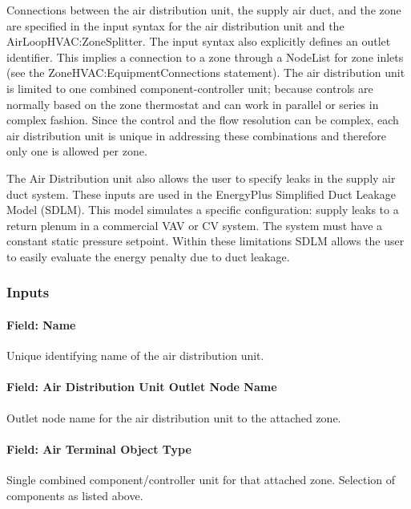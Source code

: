 Connections between the air distribution unit, the supply air duct, and the zone are specified in the input syntax for the air distribution unit and the AirLoopHVAC:ZoneSplitter. The input syntax also explicitly defines an outlet identifier. This implies a connection to a zone through a NodeList for zone inlets (see the ZoneHVAC:EquipmentConnections statement). The air distribution unit is limited to one combined component-controller unit; because controls are normally based on the zone thermostat and can work in parallel or series in complex fashion. Since the control and the flow resolution can be complex, each air distribution unit is unique in addressing these combinations and therefore only one is allowed per zone.

The Air Distribution unit also allows the user to specify leaks in the supply air duct system. These inputs are used in the EnergyPlus Simplified Duct Leakage Model (SDLM). This model simulates a specific configuration: supply leaks to a return plenum in a commercial VAV or CV system. The system must have a constant static pressure setpoint. Within these limitations SDLM allows the user to easily evaluate the energy penalty due to duct leakage.

\subsubsection{Inputs}\label{inputs-055}

\paragraph{Field: Name}\label{field-name-053}

Unique identifying name of the air distribution unit.

\paragraph{Field: Air Distribution Unit Outlet Node Name}\label{field-air-distribution-unit-outlet-node-name}

Outlet node name for the air distribution unit to the attached zone.

\paragraph{Field: Air Terminal Object Type}\label{field-air-terminal-object-type}

Single combined component/controller unit for that attached zone. Selection of components as listed above.


